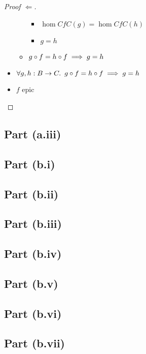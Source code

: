 \begin{prop}
\begin{proof}[Proof $\Leftarrow$]
\begin{itemize}
\begin{itemize}
\begin{itemize}
            \item[\iffs] $\hom{C}{f}{C}(g) = \hom{C}{f}{C}(h)$
              \marginnote{\Def-\ref{def:contra-hom}}

            \item[\imps] $g = h$
            \end{itemize}

          \item[\imps] $g\circ f = h\circ f \implies g = h$
            \marginnote{\imps-\Intro-$\dagger$}
        \end{itemize}
      \item[\imps] $\forall g, h : B \to C\ldotp~g\circ f = h\circ f \implies g = h$
        \marginnote{$\forall$-\Intro-$\star$}

      \item[\iffs] $f$ epic
        \qedhere
    \end{itemize}
  \end{proof}
\end{prop}

\subsection{Part (a.iii)}\label{sec:q-1-a-iii}
\subsection{Part (b.i)}\label{sec:q-1-b-i}
\subsection{Part (b.ii)}\label{sec:q-1-b-ii}
\subsection{Part (b.iii)}\label{sec:q-1-b-iii}
\subsection{Part (b.iv)}\label{sec:q-1-b-iv}
\subsection{Part (b.v)}\label{sec:q-1-b-v}
\subsection{Part (b.vi)}\label{sec:q-1-b-vi}
\subsection{Part (b.vii)}\label{sec:q-1-b-vii}
